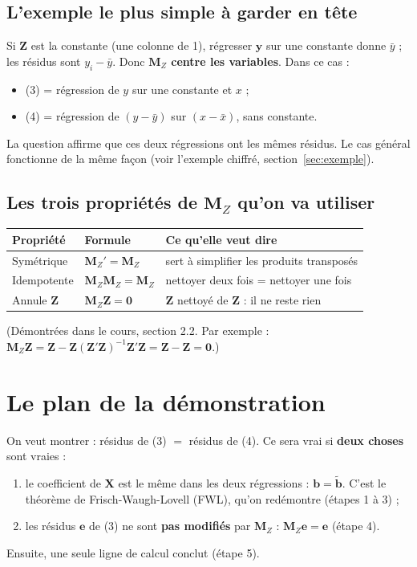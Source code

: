 \documentclass[11pt,a4paper]{article}
\newcommand{\vy}{\mathbf{y}}\newcommand{\vX}{\mathbf{X}}\newcommand{\vZ}{\mathbf{Z}}
\newcommand{\ve}{\mathbf{e}}\newcommand{\vb}{\mathbf{b}}\newcommand{\vc}{\mathbf{c}}
\newcommand{\Mz}{\mathbf{M}_Z}\newcommand{\Pz}{\mathbf{P}_Z}
\begin{document}
\subsection*{L'exemple le plus simple à garder en tête}
Si $\vZ$ est la constante (une colonne de 1), régresser $\vy$ sur une constante donne $\bar y$ ; les résidus sont $y_i-\bar y$. Donc \textbf{$\Mz$ centre les variables}. Dans ce cas :
\begin{itemize}[nosep]
\item (3) = régression de $y$ sur une constante et $x$ ;
\item (4) = régression de $(y-\bar y)$ sur $(x-\bar x)$, sans constante.
\end{itemize}
La question affirme que ces deux régressions ont les mêmes résidus. Le cas général fonctionne de la même façon (voir l'exemple chiffré, section~\ref{sec:exemple}).

\subsection*{Les trois propriétés de $\Mz$ qu'on va utiliser}
\begin{center}
\renewcommand{\arraystretch}{1.3}
\begin{tabular}{@{}lll@{}}
\toprule
Propriété & Formule & Ce qu'elle veut dire \\
\midrule
Symétrique & $\Mz'=\Mz$ & sert à simplifier les produits transposés \\
Idempotente & $\Mz\Mz=\Mz$ & nettoyer deux fois = nettoyer une fois \\
Annule $\vZ$ & $\Mz\vZ=\mathbf 0$ & $\vZ$ nettoyé de $\vZ$ : il ne reste rien \\
\bottomrule
\end{tabular}
\end{center}
(Démontrées dans le cours, section 2.2. Par exemple : $\Mz\vZ=\vZ-\vZ(\vZ'\vZ)^{-1}\vZ'\vZ=\vZ-\vZ=\mathbf 0$.)

\section{Le plan de la démonstration}

On veut montrer : résidus de (3) $=$ résidus de (4). Ce sera vrai si \textbf{deux choses} sont vraies :
\begin{enumerate}[label=\textbf{(\Alph*)}]
\item le coefficient de $\vX$ est le même dans les deux régressions : $\vb=\tilde{\vb}$. C'est le théorème de Frisch-Waugh-Lovell (FWL), qu'on redémontre (étapes 1 à 3) ;
\item les résidus $\ve$ de (3) ne sont \textbf{pas modifiés} par $\Mz$ : $\Mz\ve=\ve$ (étape 4).
\end{enumerate}
Ensuite, une seule ligne de calcul conclut (étape 5).
\end{document}
